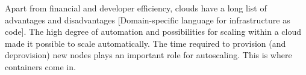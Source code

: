 Apart from financial and developer efficiency, clouds have a long list of advantages and disadvantages [Domain-specific language for infrastructure as code]. %
\newline
The high degree of automation and possibilities for scaling within a cloud made it possible to scale automatically. The time required to provision (and deprovision) new nodes plays an important role for autoscaling. This is where containers come in.



